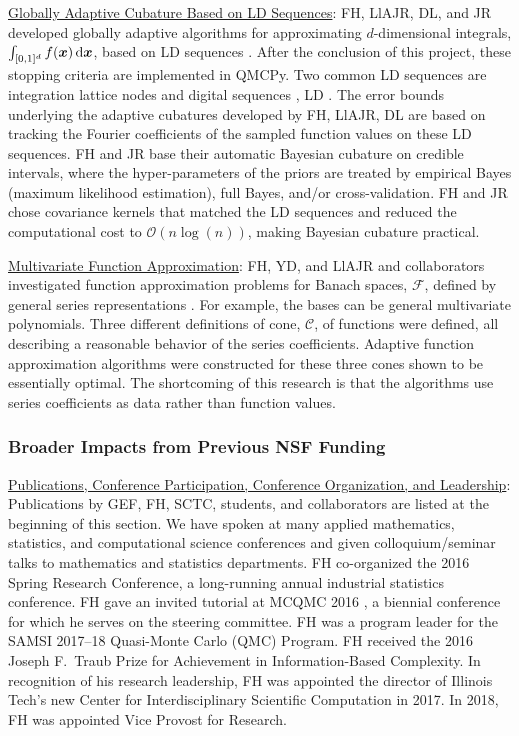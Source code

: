 \documentclass[11pt]{NSFamsart}
\newcommand{\Upara}[1]{\noindent\underline{#1}:\xspace}
\newcommand{\bx}{{\boldsymbol{x}}}
\def\dif{\textup{d}}
\newcommand{\calc}{{\mathcal{C}}}
\newcommand{\calf}{{\mathcal{F}}}
\newcommand{\Order}{\mathcal{O}}
\begin{document}
\Upara{Globally Adaptive Cubature Based on LD Sequences}
FH, LlAJR, DL, and JR developed globally adaptive algorithms for approximating $d$-dimensional integrals,  $\int_{[0,1]^d} f(\bx) \, \dif \bx$, based on LD sequences \cite{HicJim16a,HicEtal17a,JimHic16a}.  After the conclusion of this project, these stopping criteria are implemented in QMCPy. Two common LD sequences are integration lattice nodes and digital sequences \cite{DicEtal14a}, LD .  The error bounds underlying the adaptive cubatures developed by FH, LlAJR, DL are based on tracking the  Fourier coefficients of the sampled function values on these LD sequences.  FH and JR base their automatic Bayesian cubature on credible intervals, where the hyper-parameters of the priors are treated by empirical Bayes (maximum likelihood estimation), full Bayes, and/or cross-validation.   FH and JR chose covariance kernels that matched the LD sequences and reduced the computational cost to $\Order(n \log(n))$, making Bayesian cubature practical. 

\Upara{Multivariate Function Approximation}
FH, YD, and LlAJR and collaborators investigated function approximation problems for Banach spaces, $\calf$, defined by general series representations \cite{DinHic20a,DinEtal20a}.  For example, the bases can be general multivariate polynomials.  Three different definitions of cone, $\calc$, of functions were defined, all describing a reasonable behavior of the series coefficients.  Adaptive function approximation algorithms were constructed for these three cones shown to be essentially optimal.  The shortcoming of this research is that the algorithms use series coefficients as data rather than function values. 


\subsubsection{Broader Impacts from Previous NSF Funding} \label{prevBIsect}
\phantom{a}

\Upara{Publications, Conference Participation, Conference Organization, and Leadership} Publications by GEF, FH,  SCTC, students, and collaborators are listed at the beginning of this section.  We have spoken at many applied mathematics, statistics, 
and computational science conferences and given colloquium/seminar talks to mathematics and 
statistics departments.  FH co-organized the 
2016 Spring Research 
Conference, a long-running annual industrial statistics conference.   FH gave an invited tutorial
at MCQMC 2016
\cite{Hic17a}, a biennial conference for which he serves on the steering committee.  FH 
was a program leader for the SAMSI 2017--18 Quasi-Monte Carlo (QMC) Program.   FH received the 2016 Joseph F.\ Traub Prize for Achievement in Information-Based Complexity. In recognition of his research leadership, FH was appointed the director of Illinois Tech's new Center for Interdisciplinary 
Scientific Computation in 2017.  In 2018, FH was appointed Vice Provost for Research.
\end{document}

